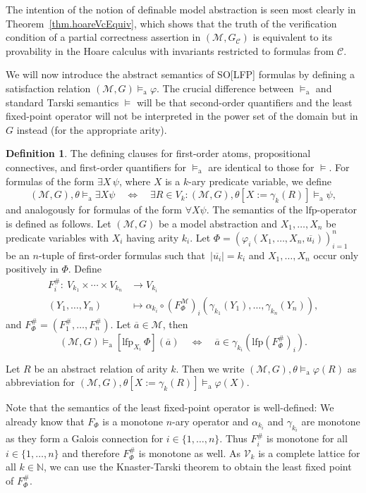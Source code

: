 \documentclass[acmsmall]{acmart}
\theoremstyle{plain}
\theoremstyle{definition}
\newtheorem{definition}[theorem]{Definition}
\newcommand{\calM}{\mathcal{M}}
\newcommand{\calC}{\mathcal{C}}
\newcommand{\mybar}[1]{\overline{#1}}
\newcommand{\Nat}{\mathbb{N}}
\newcommand{\lfp}{\mathrm{lfp}} %
\newcommand{\modelsa}{\models_\mathrm{a}} %
\begin{document}
The intention of the notion of definable model abstraction is seen most clearly in
 Theorem~\ref{thm.hoareVcEquiv}, which shows that the truth of the verification condition
 of a partial correctness assertion in $(\calM, G_\calC)$ is equivalent to its provability in
 the Hoare calculus with invariants restricted to formulas from $\calC$.

We will now introduce the abstract semantics of SO[LFP] formulas by defining a satisfaction relation
 $(\calM, G) \modelsa \varphi$.
The crucial difference between $\modelsa$ and standard Tarski semantics $\models$ will be that
second-order quantifiers and the least fixed-point operator will not be interpreted in the power set
of the domain but in $G$ instead (for the appropriate arity).
%
\begin{definition}
	The defining clauses for first-order atoms, propositional connectives, and first-order
	quantifiers for $\modelsa$ are identical to those for $\models$. 
	For formulas of the form $\exists X\, \psi$, where $X$ is a $k$-ary predicate variable, we define
	\[
	(\calM,G),\theta \modelsa \exists X \psi \quad \Leftrightarrow \quad \exists R \in V_k: (\calM,G),\theta[X := \gamma_k(R)] \modelsa \psi,
	\]
	and analogously for formulas of the form $\forall X \psi$.
	The semantics of the $\lfp$-operator is defined as follows. Let $(\calM,G)$ be a model abstraction and $X_1,\ldots,X_n$ be predicate variables with $X_i$ having arity $k_i$. Let
	$\Phi = (\varphi_i(X_1,\ldots,X_n,\mybar{u_i}))_{i=1}^n$ be an $n$-tuple of first-order formulas
	such that\ $|\mybar{u_i}| = k_i$ and $X_1,\ldots,X_n$ occur only positively in $\Phi$.
	Define
	\begin{align*}
		F_i^{\#}: ~V_{k_1} \times \cdots \times V_{k_n} &\rightarrow V_{k_i}\\
		(Y_1, \ldots ,Y_n) &\mapsto \alpha_{k_i} \circ (F_{\Phi}^{\calM})_i(\gamma_{k_1}(Y_1), \ldots ,\gamma_{k_n}(Y_n)),
	\end{align*}
	and $F_{\Phi}^{\#} = (F_1^{\#},\ldots,F_n^{\#})$.
	Let $\mybar{a} \in \calM$, then
	\[
	(\calM,G) \modelsa [\lfp_{X_i} ~\Phi](\mybar{a}) \quad \Leftrightarrow \quad \mybar{a} \in \gamma_{k_i}( \lfp(F_{\Phi}^{\#})_i).
	\]
	
	
	Let $R$ be an abstract relation of arity $k$. Then we write $(\calM,G),\theta \modelsa \varphi(R)$ as abbreviation for $(\calM,G),\theta[X := \gamma_k(R)] \modelsa \varphi(X).$
\end{definition}
%
Note that the semantics of the least fixed-point operator is well-defined:
We already know that $F_{\Phi}$ is a monotone $n$-ary operator and $\alpha_{k_i}$ and $\gamma_{k_i}$ are monotone
as they form a Galois connection for $i \in \{1,\ldots,n\}$.
Thus $F_i^{\#}$ is monotone for all $i \in \{1,\ldots,n\}$ and therefore $F_{\Phi}^{\#}$ is monotone as
well. As $\mathcal{V}_k$ is a complete lattice for all $k \in \Nat$, we can use the Knaster-Tarski theorem
to obtain the least fixed point of $F_{\Phi}^{\#}$.
\end{document}
